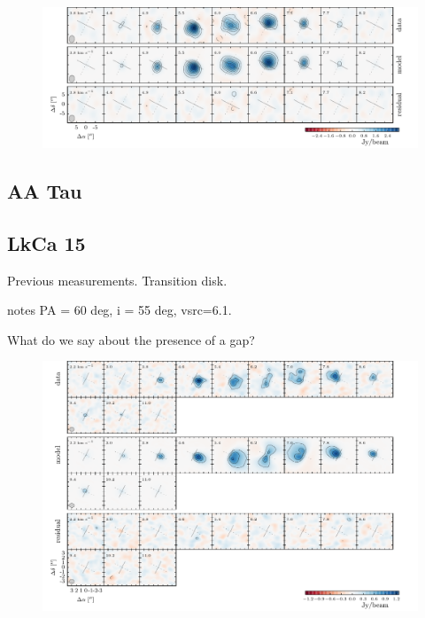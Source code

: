 \documentclass[twocolumn]{aastex6}
\begin{document}
\begin{figure}[htb]
\begin{center}
  \includegraphics{DMTau.pdf}
  \end{center}
\end{figure}

\subsection{AA Tau}

\subsection{LkCa 15}
Previous measurements. Transition disk.

\citep{vandermarel15} notes PA = 60 deg, i = 55 deg,  vsrc=6.1.

What do we say about the presence of a gap?

\begin{figure}[htb]
\begin{center}
  \includegraphics{LkCa15.pdf}
  \end{center}
\end{figure}
\end{document}
